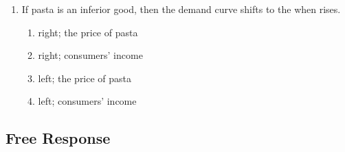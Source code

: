 \documentclass{article}
\begin{document}
\begin{enumerate}
\item If pasta is an inferior good, then the demand curve shifts to the \underline{\phantom{xxxxxxxxxx}} when \underline{\phantom{xxxxxxxxxx}} rises.

	\begin{enumerate}
	
	\item right; the price of pasta
	
	\item right; consumers' income
	
	\item left; the price of pasta
	
	\item left; consumers' income
	
	\end{enumerate}

\end{enumerate}

\subsection*{Free Response}
\end{document}
